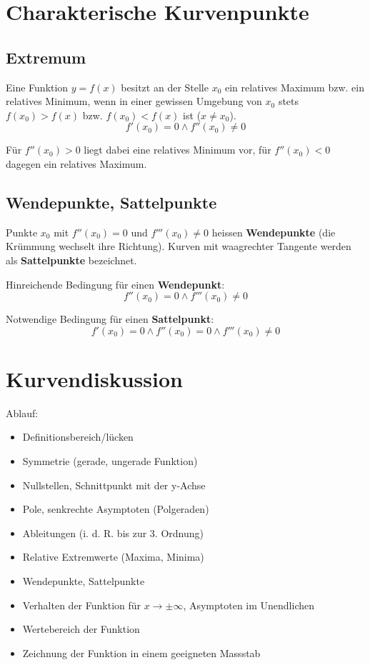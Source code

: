 \section{Charakterische Kurvenpunkte} %
\label{sec:charakterische_kurvenpunkte}
\subsection{Extremum} %
\label{sub:extremum}
Eine Funktion \(y = f(x) \) besitzt an der Stelle \(x_0\) ein relatives Maximum bzw. ein relatives Minimum, wenn in einer gewissen Umgebung von \(x_0\) stets \newline
\(f(x_0) > f(x) \) bzw. \( f(x_0) < f(x) \) \newline
ist (\(x \neq x_0\)).
	\[f'(x_0) = 0 \wedge f''(x_0) \neq 0 \]

Für \(f''(x_0) > 0 \) liegt dabei eine relatives Minimum vor, für \(f''(x_0) < 0 \) dagegen ein relatives Maximum.
\subsection{Wendepunkte, Sattelpunkte} %
Punkte \(x_0\) mit \(f''(x_0) = 0 \) und \(f'''(x_0) \neq 0 \) heissen \textbf{Wendepunkte} (die Krümmung wechselt ihre Richtung). Kurven mit waagrechter Tangente werden als \textbf{Sattelpunkte} bezeichnet.
\par Hinreichende Bedingung für einen \textbf{Wendepunkt}:
$$f''(x_0) = 0 \wedge f'''(x_0) \neq 0$$

Notwendige Bedingung für einen \textbf{Sattelpunkt}:
\[f'(x_0) = 0 \wedge f''(x_0) = 0 \wedge f'''(x_0) \neq 0 \]

\section{Kurvendiskussion}
Ablauf:\newline
\begin{itemize}
	\item Definitionsbereich/lücken
	\item Symmetrie (gerade, ungerade Funktion)
	\item Nullstellen, Schnittpunkt mit der y-Achse
	\item Pole, senkrechte Asymptoten (Polgeraden)
	\item Ableitungen (i. d. R. bis zur 3. Ordnung)
	\item Relative Extremwerte (Maxima, Minima)
	\item Wendepunkte, Sattelpunkte
	\item Verhalten der Funktion für \(x \rightarrow \pm \infty \), Asymptoten im Unendlichen
	\item Wertebereich der Funktion
	\item Zeichnung der Funktion in einem geeigneten Massstab
\end{itemize}
